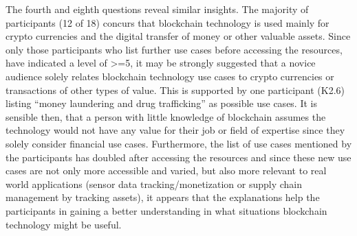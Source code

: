 The fourth and eighth questions reveal similar insights. The majority of participants (12 of 18) concurs that blockchain technology is used mainly for crypto currencies and the digital transfer of money or other valuable assets. Since only those participants who list further use cases before accessing the resources, have indicated a level of >=5, it may be strongly suggested that a novice audience solely relates blockchain technology use cases to crypto currencies or transactions of other types of value. This is supported by one participant (K2.6) listing \enquote{money laundering and drug trafficking} as possible use cases. It is sensible then, that a person with little knowledge of blockchain assumes the technology would not have any value for their job or field of expertise since they solely consider financial use cases. Furthermore, the list of use cases mentioned by the participants has doubled after accessing the resources and since these new use cases are not only more accessible and varied, but also more relevant to real world applications (sensor data tracking/monetization or supply chain management by tracking assets), it appears that the explanations help the participants in gaining a better understanding in what situations blockchain technology might be useful.

